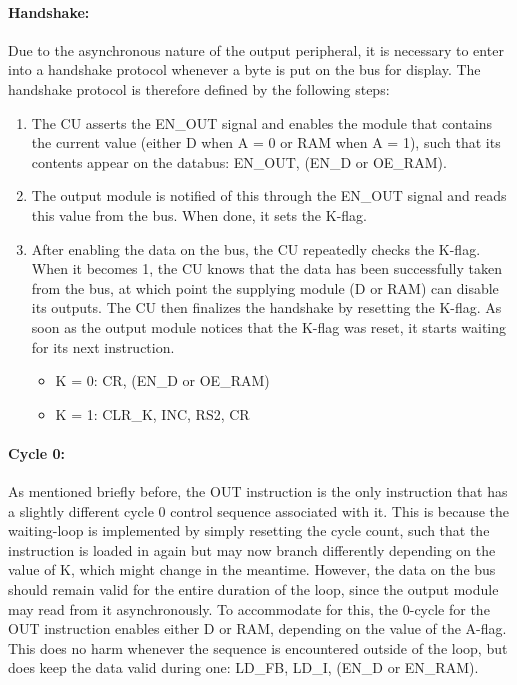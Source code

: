 \documentclass{article}
\begin{document}
\paragraph{Handshake:} Due to the asynchronous nature of the output peripheral, it is necessary to enter into a handshake protocol whenever a byte is put on the bus for display. The handshake protocol is therefore defined by the following steps:
\begin{enumerate}
\item The CU asserts the EN\_OUT signal and enables the module that contains the current value (either D when A = 0 or RAM when A = 1), such that its contents appear on the databus: EN\_OUT, (EN\_D or OE\_RAM).
\item The output module is notified of this through the EN\_OUT signal and reads this value from the bus. When done, it sets the K-flag.
\item After enabling the data on the bus, the CU repeatedly checks the K-flag. When it becomes 1, the CU knows that the data has been successfully taken from the bus, at which point the supplying module (D or RAM) can disable its outputs. The CU then finalizes the handshake by resetting the K-flag. As soon as the output module notices that the K-flag was reset, it starts waiting for its next instruction.
  \begin{itemize}
  \item K = 0: CR, (EN\_D or OE\_RAM)
  \item K = 1: CLR\_K, INC, RS2, CR   
  \end{itemize}
\end{enumerate}


\paragraph{Cycle 0:} As mentioned briefly before, the OUT instruction is the only instruction that has a slightly different cycle 0 control sequence associated with it. This is because the waiting-loop is implemented by simply resetting the cycle count, such that the instruction is loaded in again but may now branch differently depending on the value of K, which might change in the meantime. However, the data on the bus should remain valid for the entire duration of the loop, since the output module may read from it asynchronously. To accommodate for this, the 0-cycle for the OUT instruction enables either D or RAM, depending on the value of the A-flag. This does no harm whenever the sequence is encountered outside of the loop, but does keep the data valid during one: LD\_FB, LD\_I, (EN\_D or EN\_RAM).
\end{document}
